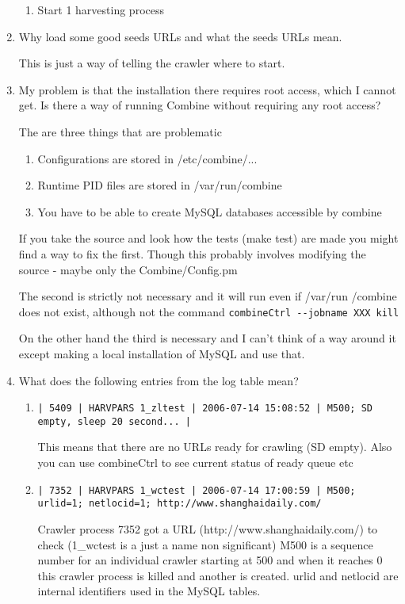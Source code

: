 \begin{enumerate}
\begin{enumerate}
\item Start 1 harvesting process
\end{enumerate}

\item
Why load some good seeds URLs and what the seeds URLs mean.

This is just a way of telling the crawler where to start.

\item
 My problem is that the
installation there requires root access, which I cannot get.
Is there a
way of running Combine without requiring any root access?

The are three things that are problematic
\begin{enumerate}
  \item Configurations are stored in /etc/combine/...
  \item Runtime PID files are stored in /var/run/combine
  \item You have to be able to create MySQL databases accessible by combine
\end{enumerate}

If you take the source and look how the tests (make test) are made you might find a way to
fix the first. Though this probably involves modifying the source - maybe only the Combine/Config.pm

The second is strictly not necessary and it will run even if /var/run /combine does not exist, although not
   the command \verb+combineCtrl --jobname XXX kill+

On the other hand the third is necessary and I can't think of a way around it except making a local installation of MySQL and use
that.

\item What does the following entries from the log table mean?
\begin{enumerate}
\item
\verb+| 5409 | HARVPARS 1_zltest | 2006-07-14 15:08:52 | M500; SD empty, sleep 20 second... |+

This means that there are no URLs ready for crawling (SD empty).
Also you can use combineCtrl to see current status of ready queue etc


\item
\verb+| 7352 | HARVPARS 1_wctest | 2006-07-14 17:00:59 | M500; urlid=1; netlocid=1; http://www.shanghaidaily.com/+

Crawler process 7352 got a URL (http://www.shanghaidaily.com/) to check
(1\_wctest is a just a name non significant)
M500 is a sequence number for an individual crawler starting at 500 and when it reaches 0 this crawler
process is killed and another is created.
urlid and netlocid are internal identifiers used in the MySQL tables.


\end{enumerate}
\end{enumerate}
